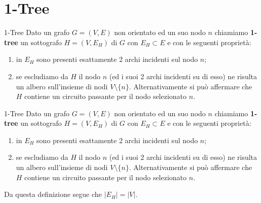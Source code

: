 \documentclass[10pt]{beamer}
\begin{document}
    \section{1-Tree}\label{sec:1-tree}

    \begin{frame}{1-Tree}
        Dato un grafo $G=(V,E)$ non orientato ed un suo nodo $n$ chiamiamo \textbf{1-tree} un sottografo $H = (V, E_H)$ di $G$ con $E_H \subset E$ e con le seguenti proprietà:
        \begin{enumerate}[<+->]
            \item in $E_H$ sono presenti esattamente 2 archi incidenti sul nodo $n$;
            \item se escludiamo da $H$ il nodo $n$ (ed i suoi 2 archi incidenti su di esso) ne risulta un albero sull'insieme di nodi $V \setminus \{n\}$. \newline Alternativamente si può affermare che $H$ contiene un circuito passante per il nodo selezionato $n$.
        \end{enumerate}
    \end{frame}

    \begin{frame}{1-Tree}
        Dato un grafo $G=(V,E)$ non orientato ed un suo nodo $n$ chiamiamo \textbf{1-tree} un sottografo $H = (V, E_H)$ di $G$ con $E_H \subset E$ e con le seguenti proprietà:
        \begin{enumerate}
            \item in $E_H$ sono presenti esattamente 2 archi incidenti sul nodo $n$;
            \item se escludiamo da $H$ il nodo $n$ (ed i suoi 2 archi incidenti su di esso) ne risulta un albero sull'insieme di nodi $V \setminus \{n\}$. \newline Alternativamente si può affermare che $H$ contiene un circuito passante per il nodo selezionato $n$.
        \end{enumerate}
        Da questa definizione segue che $|E_H| = |V|$.
    \end{frame}
\end{document}
